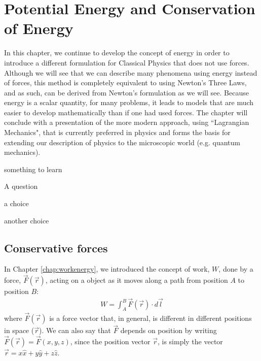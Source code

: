 
\chapter{Potential Energy and Conservation of Energy}
\label{chapter:potentialecons}
In this chapter, we continue to develop the concept of energy in order to introduce a different formulation for Classical Physics that does not use forces. Although we will see that we can describe many phenomena using energy instead of forces, this method is completely equivalent to using Newton's Three Laws, and as such, can be derived from Newton's formulation as we will see. Because energy is a scalar quantity, for many problems, it leads to models that are much easier to develop mathematically than if one had used forces. The chapter will conclude with a presentation of the more modern approach, using ``Lagrangian Mechanics", that is currently preferred in physics and forms the basis for extending our description of physics to the microscopic world (e.g. quantum mechanics). 

\begin{learningObjectives}{
 \item something to learn
 }
\end{learningObjectives}

\begin{opening}
\begin{MCquestion}{A question}
\item a choice
\item another choice %
\end{MCquestion}
\end{opening}

\section{Conservative forces}
In Chapter \ref{chap:workenergy}, we introduced the concept of work, $W$, done by a force, $\vec F(\vec r)$, acting on a object as it moves along a path from position $A$ to position $B$:
\begin{align}
\label{eq:potentialecons:workdef}
W = \int_A^B \vec F(\vec r) \cdot d\vec l
\end{align}
where $\vec F(\vec r)$ is a force vector that, in general, is different in different positions in space ($\vec r$). We can also say that $\vec F$ depends on position by writing $\vec F(\vec r)=\vec F(x,y,z)$, since the position vector $\vec r$, is simply the vector $\vec r = x\hat x + y \hat y+ z\hat z$. 

